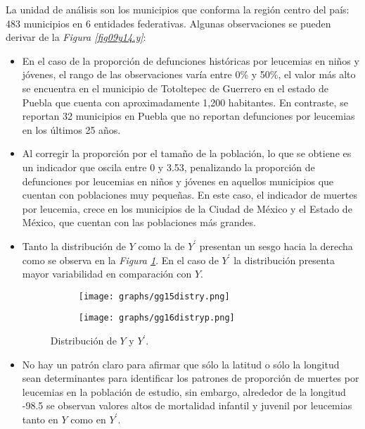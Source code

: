 \documentclass[11pt, oneside]{book}
\begin{document}
\newpage

La unidad de análisis son los municipios que conforma la región centro del país: 483 municipios en 6 entidades federativas. Algunas observaciones se pueden derivar de la \emph{Figura \ref{fig09y14.y}}:

\begin{itemize}
  
  \item En el caso de la proporción de defunciones históricas por leucemias en niños y jóvenes, el rango de las observaciones varía entre 0\% y 50\%, el valor más alto se encuentra en el municipio de Totoltepec de Guerrero en el estado de Puebla que cuenta con aproximadamente 1,200 habitantes. En contraste, se reportan 32 municipios en Puebla que no reportan defunciones por leucemias en los últimos 25 años.
  
  \item Al corregir la proporción por el tamaño de la población, lo que se obtiene es un indicador que oscila entre 0 y 3.53, penalizando la proporción de defunciones por leucemias en niños y jóvenes en aquellos municipios que cuentan con poblaciones muy pequeñas. En este caso, el indicador de muertes por leucemia, crece en los municipios de la Ciudad de México y el Estado de México, que cuentan con las poblaciones más grandes.
  \item Tanto la distribución de $Y$ como la de $Y^{'}$ presentan un sesgo hacia la derecha como se observa en la \emph{Figura \ref{fig15y16.distry}}. En el caso de $Y^{'}$ la distribución presenta mayor variabilidad en comparación con $Y$.
  
  \begin{figure}[ht]
  	\begin{subfigure}{.5\textwidth}
  	  \centering
  	  \texttt{[image: graphs/gg15distry.png]}
  	\end{subfigure}%
  	\begin{subfigure}{.5\textwidth}
  	  \centering
      \texttt{[image: graphs/gg16distryp.png]}
  	\end{subfigure}
    \caption{Distribución de $Y$ y $Y^{'}$.}
    \label{fig15y16.distry}
  \end{figure}
  
  \item No hay un patrón claro para afirmar que sólo la latitud o sólo la longitud sean determinantes para identificar los patrones de proporción de muertes por leucemias en la población de estudio, sin embargo, alrededor de la longitud -98.5 se observan valores altos de mortalidad infantil y juvenil por leucemias tanto en $Y$ como en $Y^{'}$.
    
\end{itemize}
\end{document}
